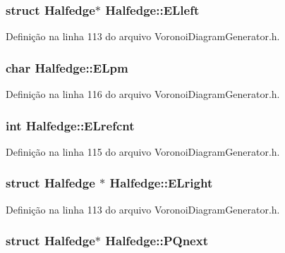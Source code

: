 \subsubsection[{E\+Lleft}]{\setlength{\rightskip}{0pt plus 5cm}struct {\bf Halfedge}$\ast$ Halfedge\+::\+E\+Lleft}\label{struct_halfedge_a94c7c9a14dfc27cd104b171739f3029a}


Definição na linha 113 do arquivo Voronoi\+Diagram\+Generator.\+h.

\subsubsection[{E\+Lpm}]{\setlength{\rightskip}{0pt plus 5cm}char Halfedge\+::\+E\+Lpm}\label{struct_halfedge_a36e688c7989974e7af28c3861e60085d}


Definição na linha 116 do arquivo Voronoi\+Diagram\+Generator.\+h.

\subsubsection[{E\+Lrefcnt}]{\setlength{\rightskip}{0pt plus 5cm}int Halfedge\+::\+E\+Lrefcnt}\label{struct_halfedge_ac6326ffa12cd091f7c4026a9a13e183f}


Definição na linha 115 do arquivo Voronoi\+Diagram\+Generator.\+h.

\subsubsection[{E\+Lright}]{\setlength{\rightskip}{0pt plus 5cm}struct {\bf Halfedge} $\ast$ Halfedge\+::\+E\+Lright}\label{struct_halfedge_ada284144a5ea43440922187eeca46535}


Definição na linha 113 do arquivo Voronoi\+Diagram\+Generator.\+h.

\subsubsection[{P\+Qnext}]{\setlength{\rightskip}{0pt plus 5cm}struct {\bf Halfedge}$\ast$ Halfedge\+::\+P\+Qnext}\label{struct_halfedge_a36bdfa895b041c1ef490ec557abdc3b9}



